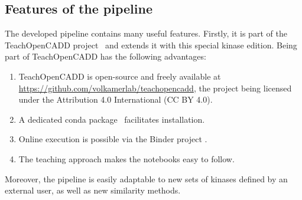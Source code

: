 \documentclass[9pt,training]{livecoms}
\begin{document}
\subsection{Features of the pipeline}
The developed pipeline contains many useful features. Firstly, it is part of the TeachOpenCADD project~\cite{Sydow_2019_JCheminform, sydow_2022_nar} and extends it with this special kinase edition. Being part of TeachOpenCADD has the following advantages:
\begin{enumerate}
    \item TeachOpenCADD is open-source and freely available at \href{https://github.com/volkamerlab/teachopencadd}{https://github.com/volkamerlab/teachopencadd}, the project being licensed under the Attribution 4.0 International (CC BY 4.0).
    \item A dedicated conda package~\cite{conda_forge} facilitates installation.
    \item Online execution is possible via the Binder project \cite{binder_2018}.
    \item The teaching approach makes the notebooks easy to follow.
\end{enumerate}
Moreover, the pipeline is easily adaptable to new sets of kinases defined by an external user, as well as new similarity methods.
\end{document}
